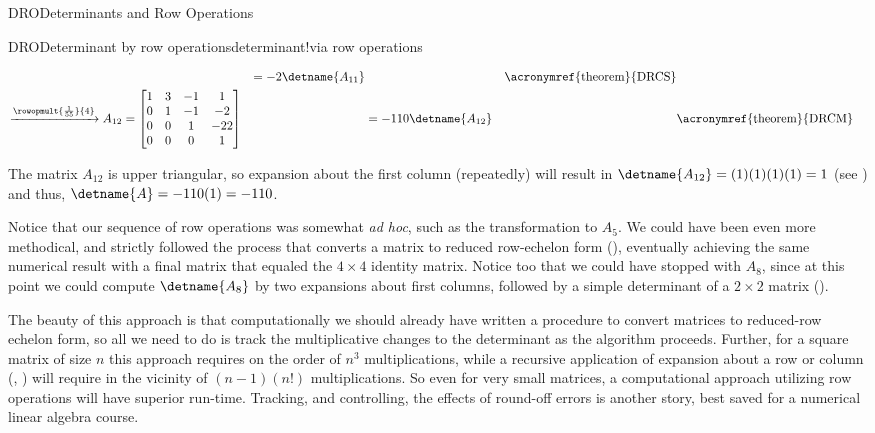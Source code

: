 \begin{subsect}{DRO}{Determinants and Row Operations}
\begin{example}{DRO}{Determinant by row operations}{determinant!via row operations}
\begin{para}
\begin{align*}
&
&=-2\detname{A_{11}}&&\text{\acronymref{theorem}{DRCS}}\\
%
\xrightarrow{\rowopmult{\frac{1}{55}}{4}}
A_{12}&=
\begin{bmatrix}
1 & 3 &-1 & 1 \\
0 & 1 &-1 &-2 \\
0 & 0 & 1 &-22\\
0 & 0 & 0 & 1
\end{bmatrix}
&
&=-110\detname{A_{12}}&&\text{\acronymref{theorem}{DRCM}}\\
%
\end{align*}
\end{para}
%
\begin{para}The matrix $A_{12}$ is upper triangular, so expansion about the first column (repeatedly) will result in $\detname{A_{12}}=(1)(1)(1)(1)=1$ (see ) and thus, $\detname{A}=-110(1)=-110$.\end{para}
%
\begin{para}Notice that our sequence of row operations was somewhat {\it ad hoc}, such as the transformation to $A_5$.  We could have been even more methodical, and strictly followed the process that converts a matrix to reduced row-echelon form (), eventually achieving the same numerical result with a final matrix that equaled the $4\times 4$ identity matrix.  Notice too that we could have stopped with $A_8$, since at this point we could compute $\detname{A_8}$ by two expansions about first columns, followed by a simple determinant of a $2\times 2$ matrix ().\end{para}
%
\begin{para}The beauty of this approach is that computationally we should already have written a procedure to convert matrices to reduced-row echelon form, so all we need to do is track the multiplicative changes to the determinant as the algorithm proceeds.   Further, for a square matrix of size $n$ this approach requires on the order of $n^3$ multiplications, while a recursive application of expansion about a row or column (, ) will require in the vicinity of $(n-1)(n!)$ multiplications.  So even for very small matrices, a computational approach utilizing row operations will have superior run-time.  Tracking, and controlling, the effects of round-off errors is another story, best saved for a numerical linear algebra course.\end{para}
%
\end{example}
%
\end{subsect}
